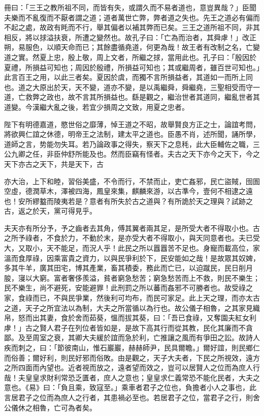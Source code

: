 \begin{pinyinscope}
冊曰：「三王之教所祖不同，而皆有失，或謂久而不易者道也，意豈異哉？」臣聞夫樂而不亂復而不厭者謂之道；道者萬世亡弊，弊者道之失也。先王之道必有偏而不起之處，故政有眊而不行，舉其偏者以補其弊而已矣。三王之道所祖不同，非其相反，將以捄溢扶衰，所遭之變然也。故孔子曰：「亡為而治者，其舜虖！」改正朔，易服色，以順天命而已；其餘盡循堯道，何更為哉！故王者有改制之名，亡變道之實。然夏上忠，殷上敬，周上文者，所繼之捄，當用此也。孔子曰：「殷因於夏禮，所損益可知也；周因於殷禮，所損益可知也；其或繼周者，雖百世可知也。」此言百王之用，以此三者矣。夏因於虞，而獨不言所損益者，其道如一而所上同也。道之大原出於天，天不變，道亦不變，是以禹繼舜，舜繼堯，三聖相受而守一道，亡救弊之政也，故不言其所損益也。繇是觀之，繼治世者其道同，繼亂世者其道變。今漢繼大亂之後，若宜少損周之文致，用夏之忠者。

陛下有明德嘉道，愍世俗之靡薄，悼王道之不昭，故舉賢良方正之士，論誼考問，將欲興仁誼之休德，明帝王之法制，建太平之道也。臣愚不肖，述所聞，誦所學，道師之言，势能勿失耳。若乃論政事之得失，察天下之息秏，此大臣輔佐之職，三公九卿之任，非臣仲舒所能及也。然而臣竊有怪者。夫古之天下亦今之天下，今之天下亦古之天下，共是天下，古

亦大治，上下和睦，習俗美盛，不令而行，不禁而止，吏亡姦邪，民亡盜賊，囹圄空虛，德潤草木，澤被四海，鳳皇來集，麒麟來游，以古準今，壹何不相逮之遠也！安所繆盭而陵夷若是？意者有所失於古之道與？有所詭於天之理與？試跡之古，返之於天，黨可得見乎。

夫天亦有所分予，予之齒者去其角，傅其翼者兩其足，是所受大者不得取小也。古之所予祿者，不食於力，不動於末，是亦受大者不得取小，與天同意者也。夫已受大，又取小，天不能足，而況人乎！此民之所以囂囂苦不足也。身寵而載高位，家溫而食厚祿，因乘富貴之資力，以與民爭利於下，民安能如之哉！是故眾其奴婢，多其牛羊，廣其田宅，博其產業，畜其積委，務此而亡已，以迫蹴民，民日削月朘，寖以大窮。富者奢侈羨溢，貧者窮急愁苦；窮急愁苦而上不救，則民不樂生；民不樂生，尚不避死，安能避罪！此刑罰之所以蕃而姦邪不可勝者也。故受祿之家，食祿而已，不與民爭業，然後利可均布，而民可家足。此上天之理，而亦太古之道，天子之所宜法以為制，大夫之所當循以為行也。故公儀子相魯，之其家見織帛，怒而出其妻，食於舍而茹葵，慍而拔其葵，曰：「吾已食祿，又奪園夫紅女利虖！」古之賢人君子在列位者皆如是，是故下高其行而從其教，民化其廉而不貪鄙。及至周室之衰，其卿大夫緩於誼而急於利，亡推讓之風而有爭田之訟。故詩人疾而刺之，曰：「節彼南山，惟石巖巖，赫赫師尹，民具爾瞻。」爾好誼，則民鄉仁而俗善；爾好利，則民好邪而俗敗。由是觀之，天子大夫者，下民之所視效，遠方之所四面而內望也。近者視而放之，遠者望而效之，豈可以居賢人之位而為庶人行哉！夫皇皇求財利常恐乏匱者，庶人之意也；皇皇求仁義常恐不能化民者，大夫之意也。《易》曰：「負且乘，致寇至。」乘車者君子之位也，負擔者小人之事也，此言居君子之位而為庶人之行者，其患禍必至也。若居君子之位，當君子之行，則舍公儀休之相魯，亡可為者矣。


\end{pinyinscope}
